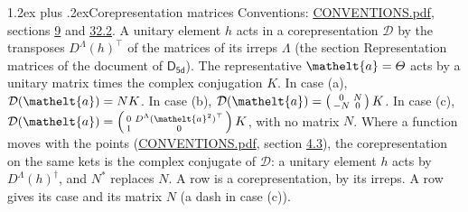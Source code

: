 \documentclass[10pt,a4paper]{article}
\makeatletter
\renewcommand\section{\@startsection{section}{1}{\z@}{-3ex plus -1ex minus -.2ex}%
  {1.2ex plus .2ex}{\normalfont\large\sffamily\bfseries\color{parttitle}}}
\numberwithin{equation}{section}
\newcommand{\eltfont}[1]{{\let\sigma\eltsigma\mathelt{#1}}}
\newcommand{\grp}[1]{\mathsf{#1}}
\newcommand{\elt}[1]{\eltfont{#1}}
\makeatother
\begin{document}
\section{Corepresentation matrices}\label{s:corep_matrices}
Conventions: \href{../../CONVENTIONS.pdf}{CONVENTIONS.pdf}, sections \href{../../../rotation/CONVENTIONS.pdf\#conv.9}{9} and \href{../../CONVENTIONS.pdf\#conv.32.2}{32.2}.
A unitary element $h$ acts in a corepresentation $\mathcal{D}$ by the transposes $D^{\Lambda}(h)^{\top}$ of the matrices of its irreps $\Lambda$ (the section Representation matrices of the document of \href{../../../rotation/data/pdf/D5d.pdf}{$\grp{D_{5d}}$}). The representative $\elt{a} = \varTheta$ acts by a unitary matrix times the complex conjugation $K$.
In case (a), $\mathcal{D}(\elt{a}) = NK$. In case (b), $\mathcal{D}(\elt{a}) = \left(\begin{smallmatrix} 0 & N \\ -N & 0 \end{smallmatrix}\right) K$. In case (c), $\mathcal{D}(\elt{a}) = \left(\begin{smallmatrix} 0 & D^{\Lambda}(\elt{a}^2)^{\top} \\ 1 & 0 \end{smallmatrix}\right) K$, with no matrix $N$.
Where a function moves with the points (\href{../../CONVENTIONS.pdf}{CONVENTIONS.pdf}, section \href{../../../rotation/CONVENTIONS.pdf\#conv.4.3}{4.3}), the corepresentation on the same kets is the complex conjugate of $\mathcal{D}$: a unitary element $h$ acts by $D^{\Lambda}(h)^{\dagger}$, and $N^{*}$ replaces $N$.
A row is a corepresentation, by its irreps. A row gives its case and its matrix $N$ (a dash in case (c)).
\end{document}
